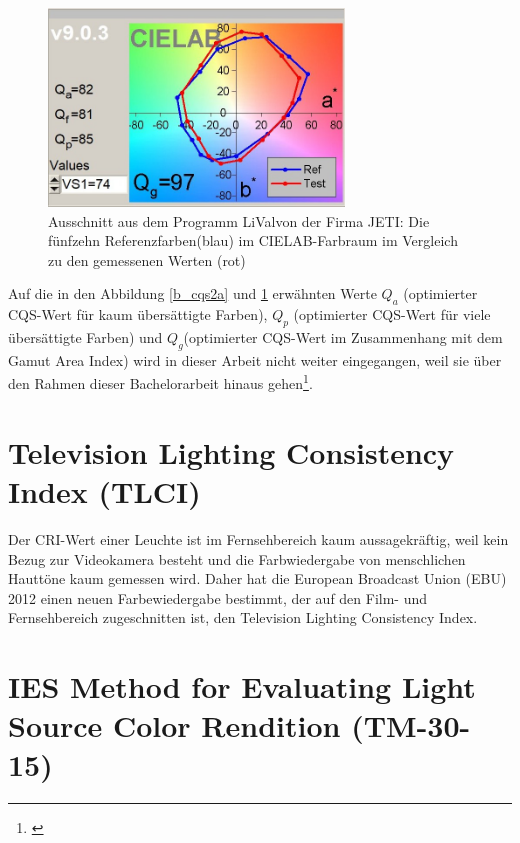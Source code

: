 \begin{figure}[htp]     %
\centering
\includegraphics[width=0.7\textwidth]{bilder/cqs2b} 
\caption {Ausschnitt aus dem Programm \glqq LiVal\grqq von der Firma JETI: Die fünfzehn Referenzfarben(blau) im CIELAB-Farbraum im Vergleich zu den gemessenen Werten (rot)}\label{b_cqs2b}
\end{figure}

Auf die in den Abbildung \ref{b_cqs2a} und \ref{b_cqs2b} erwähnten Werte $Q_{a}$ (optimierter CQS-Wert für kaum übersättigte Farben), $Q_{p}$ (optimierter CQS-Wert für viele übersättigte Farben) und $Q_{g}$(optimierter CQS-Wert im Zusammenhang mit dem Gamut Area Index) wird in dieser Arbeit nicht weiter eingegangen, weil sie über den Rahmen dieser Bachelorarbeit hinaus gehen\footnote{\cite[60-62]{khanh}}. 



 


\section{Television Lighting Consistency Index (TLCI)} \label{sec_tlci}
Der CRI-Wert einer Leuchte ist im Fernsehbereich kaum aussagekräftig, weil kein Bezug zur Videokamera besteht und die Farbwiedergabe von menschlichen Hauttöne kaum gemessen wird. Daher hat die European Broadcast Union (EBU) 2012 einen neuen Farbewiedergabe bestimmt, der auf den Film- und Fernsehbereich zugeschnitten ist, den Television Lighting Consistency Index.  


\section{IES Method for Evaluating Light Source Color Rendition (TM-30-15)} \label{sec_tm30}

